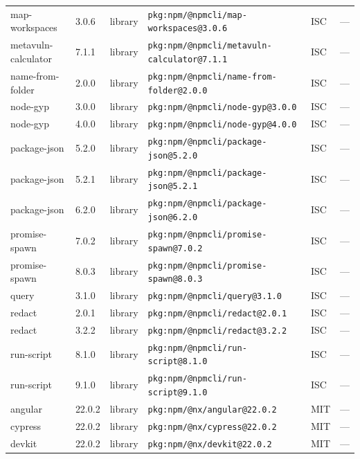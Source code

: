 \documentclass[11pt,a4paper]{article}
\begin{document}
\begin{longtable}{|p{4cm}|p{2cm}|p{1.6cm}|p{5cm}|p{1.5cm}|p{3.5cm}|}
\raggedright map-workspaces & 3.0.6 & library & \small\texttt{pkg:npm/@npmcli/map-workspaces@3.0.6} & ISC & \small — \\
\raggedright metavuln-calculator & 7.1.1 & library & \small\texttt{pkg:npm/@npmcli/metavuln-calculator@7.1.1} & ISC & \small — \\
\raggedright name-from-folder & 2.0.0 & library & \small\texttt{pkg:npm/@npmcli/name-from-folder@2.0.0} & ISC & \small — \\
\raggedright node-gyp & 3.0.0 & library & \small\texttt{pkg:npm/@npmcli/node-gyp@3.0.0} & ISC & \small — \\
\raggedright node-gyp & 4.0.0 & library & \small\texttt{pkg:npm/@npmcli/node-gyp@4.0.0} & ISC & \small — \\
\raggedright package-json & 5.2.0 & library & \small\texttt{pkg:npm/@npmcli/package-json@5.2.0} & ISC & \small — \\
\raggedright package-json & 5.2.1 & library & \small\texttt{pkg:npm/@npmcli/package-json@5.2.1} & ISC & \small — \\
\raggedright package-json & 6.2.0 & library & \small\texttt{pkg:npm/@npmcli/package-json@6.2.0} & ISC & \small — \\
\raggedright promise-spawn & 7.0.2 & library & \small\texttt{pkg:npm/@npmcli/promise-spawn@7.0.2} & ISC & \small — \\
\raggedright promise-spawn & 8.0.3 & library & \small\texttt{pkg:npm/@npmcli/promise-spawn@8.0.3} & ISC & \small — \\
\raggedright query & 3.1.0 & library & \small\texttt{pkg:npm/@npmcli/query@3.1.0} & ISC & \small — \\
\raggedright redact & 2.0.1 & library & \small\texttt{pkg:npm/@npmcli/redact@2.0.1} & ISC & \small — \\
\raggedright redact & 3.2.2 & library & \small\texttt{pkg:npm/@npmcli/redact@3.2.2} & ISC & \small — \\
\raggedright run-script & 8.1.0 & library & \small\texttt{pkg:npm/@npmcli/run-script@8.1.0} & ISC & \small — \\
\raggedright run-script & 9.1.0 & library & \small\texttt{pkg:npm/@npmcli/run-script@9.1.0} & ISC & \small — \\
\raggedright angular & 22.0.2 & library & \small\texttt{pkg:npm/@nx/angular@22.0.2} & MIT & \small — \\
\raggedright cypress & 22.0.2 & library & \small\texttt{pkg:npm/@nx/cypress@22.0.2} & MIT & \small — \\
\raggedright devkit & 22.0.2 & library & \small\texttt{pkg:npm/@nx/devkit@22.0.2} & MIT & \small — \\

\end{longtable}
\end{document}
